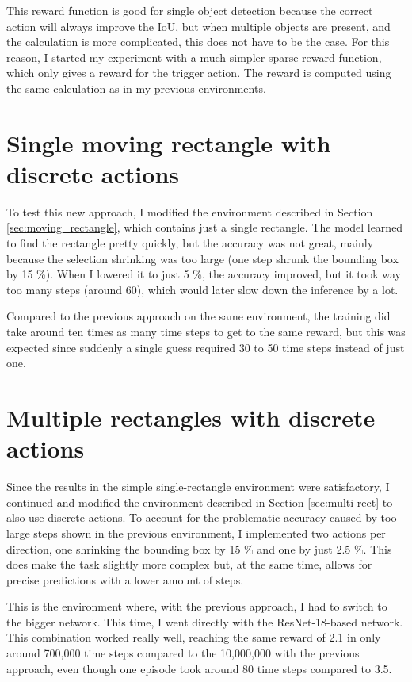 \documentclass[
  digital,     %
  oneside,     %
  nosansbold,  %
  nocolorbold, %
  lof,         %
  lot,         %
]{fithesis4}
\begin{document}
This reward function is good for single object detection because the correct action will always improve the IoU, but when multiple objects are present, and the calculation is more complicated, this does not have to be the case. For this reason, I started my experiment with a much simpler sparse reward function, which only gives a reward for the trigger action. The reward is computed using the same calculation as in my previous environments.

\section{Single moving rectangle with discrete actions}

To test this new approach, I modified the environment described in Section \ref{sec:moving_rectangle}, which contains just a single rectangle. The model learned to find the rectangle pretty quickly, but the accuracy was not great, mainly because the selection shrinking was too large (one step shrunk the bounding box by 15 \%). When I lowered it to just 5 \%, the accuracy improved, but it took way too many steps (around 60), which would later slow down the inference by a lot.

Compared to the previous approach on the same environment, the training did take around ten times as many time steps to get to the same reward, but this was expected since suddenly a single guess required 30 to 50 time steps instead of just one.

\section{Multiple rectangles with discrete actions}

Since the results in the simple single-rectangle environment were satisfactory, I continued and modified the environment described in Section \ref{sec:multi-rect} to also use discrete actions. To account for the problematic accuracy caused by too large steps shown in the previous environment, I implemented two actions per direction, one shrinking the bounding box by 15 \% and one by just 2.5 \%. This does make the task slightly more complex but, at the same time, allows for precise predictions with a lower amount of steps.

This is the environment where, with the previous approach, I had to switch to the bigger network. This time, I went directly with the ResNet-18-based network. This combination worked really well, reaching the same reward of 2.1 in only around 700,000 time steps compared to the 10,000,000 with the previous approach, even though one episode took around 80 time steps compared to 3.5.
\end{document}

